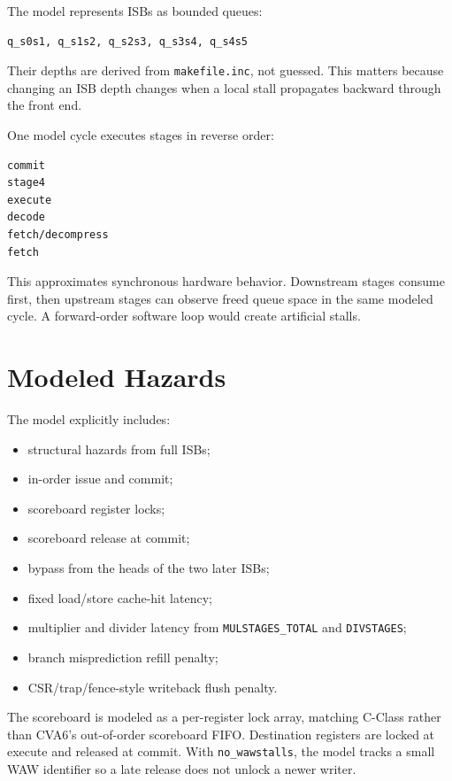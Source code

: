\documentclass[11pt]{article}
\begin{document}
The model represents ISBs as bounded queues:

\begin{verbatim}
q_s0s1, q_s1s2, q_s2s3, q_s3s4, q_s4s5
\end{verbatim}

Their depths are derived from \texttt{makefile.inc}, not guessed. This matters
because changing an ISB depth changes when a local stall propagates backward
through the front end.

One model cycle executes stages in reverse order:

\begin{verbatim}
commit
stage4
execute
decode
fetch/decompress
fetch
\end{verbatim}

This approximates synchronous hardware behavior. Downstream stages consume first,
then upstream stages can observe freed queue space in the same modeled cycle. A
forward-order software loop would create artificial stalls.

\section{Modeled Hazards}

The model explicitly includes:

\begin{itemize}
  \item structural hazards from full ISBs;
  \item in-order issue and commit;
  \item scoreboard register locks;
  \item scoreboard release at commit;
  \item bypass from the heads of the two later ISBs;
  \item fixed load/store cache-hit latency;
  \item multiplier and divider latency from \texttt{MULSTAGES\_TOTAL} and
        \texttt{DIVSTAGES};
  \item branch misprediction refill penalty;
  \item CSR/trap/fence-style writeback flush penalty.
\end{itemize}

The scoreboard is modeled as a per-register lock array, matching C-Class rather
than CVA6's out-of-order scoreboard FIFO. Destination registers are locked at
execute and released at commit. With \texttt{no\_wawstalls}, the model tracks a
small WAW identifier so a late release does not unlock a newer writer.
\end{document}
